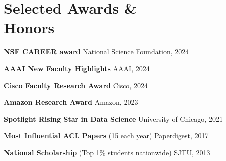 \vspace{-1mm}
\section{Selected Awards \& \\Honors}

\noindent \textbf{NSF CAREER award} \hfill National Science Foundation, 2024 

\vspace{-2mm}
\noindent \textbf{AAAI New Faculty Highlights} \hfill AAAI, 2024

\vspace{-2mm}
\noindent \textbf{Cisco Faculty Research Award} \hfill Cisco, 2024





\vspace{-2mm}
\noindent \textbf{Amazon Research Award} \hfill Amazon, 2023 

\vspace{-2mm}
\noindent \textbf{Spotlight Rising Star in Data Science} \hfill University of Chicago, 2021 



\vspace{-2mm}
\noindent \textbf{Most Influential ACL Papers} {\small (15 each year)} \hfill Paperdigest, 2017 

\vspace{-2mm}
\noindent \textbf{National Scholarship} {\small (Top 1\% students nationwide)} \hfill SJTU, 2013 \\

